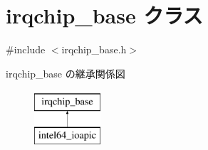 \hypertarget{classirqchip__base}{}\section{irqchip\+\_\+base クラス}
\label{classirqchip__base}


{\ttfamily \#include $<$irqchip\+\_\+base.\+h$>$}

irqchip\+\_\+base の継承関係図\begin{figure}[H]
\begin{center}
\leavevmode
\includegraphics[height=2.000000cm]{classirqchip__base}
\end{center}
\end{figure}
